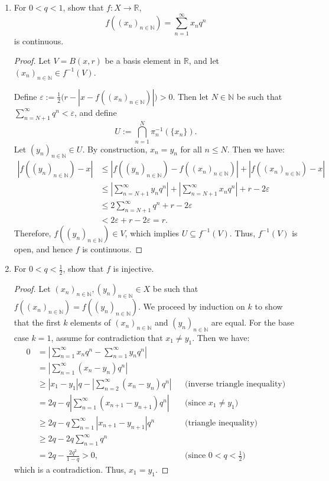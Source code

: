 \documentclass[a4paper,11pt]{article}
\newcommand{\N}{\mathbb{N}}
\newcommand{\R}{\mathbb{R}}
\newcommand{\inv}[1]{#1^{-1}}
\newcommand{\eps}{\varepsilon}
\begin{document}
\begin{enumerate}[label=\textbf{(\alph*)}]
    \item For $0 < q < 1$, show that $f \colon X \to \R$,
    \[ f((x_n)_{n\in\N}) = \sum_{n=1}^{\infty} x_n q^n \]
    is continuous.

    \begin{proof}
        Let $V = B(x, r)$ be a basis element in $\R$, and let $(x_n)_{n\in\N} \in \inv{f}(V)$.

        Define $\eps := \frac{1}{2}\bigl(r - |x - f((x_n)_{n\in\N})|\bigr) > 0$.
        Then let $N \in \N$ be such that $\sum_{n=N+1}^{\infty} q^n < \eps$, and define
        \[ U := \bigcap_{n=1}^N \inv{\pi_n}(\{x_n\}). \]
        Let $(y_n)_{n\in\N} \in U$. By construction, $x_n = y_n$ for all $n \leq N$. Then we have:
        \begin{align*}
        |f((y_n)_{n\in\N}) - x| &\leq |f((y_n)_{n\in\N}) - f((x_n)_{n\in\N})| + |f((x_n)_{n\in\N}) - x| \\
        &\leq \left|\sum_{n=N+1}^{\infty} y_n q^n\right| + \left|\sum_{n=N+1}^{\infty} x_n q^n\right| + r - 2\eps \\
        &\leq 2\sum_{n=N+1}^{\infty} q^n + r - 2\eps \\
        &< 2\eps + r - 2\eps = r.
        \end{align*}
        Therefore, $f((y_n)_{n\in\N}) \in V$, which implies $U \subseteq \inv{f}(V)$.
        Thus, $\inv{f}(V)$ is open, and hence $f$ is continuous. 
    \end{proof}

    \item For $0 < q < \frac{1}{2}$, show that $f$ is injective.
    \begin{proof}
        Let $(x_n)_{n\in\N}, (y_n)_{n\in\N} \in X$ be such that $f((x_n)_{n\in\N}) = f((y_n)_{n\in\N})$. 
        We proceed by induction on $k$ to show that the first $k$ elements of $(x_n)_{n\in\N}$ and $(y_n)_{n\in\N}$ are equal. For the base case $k=1$, assume for contradiction that $x_1 \neq y_1$.
        Then we have:
        \begin{align*}
            0 &= \left|\sum_{n=1}^{\infty} x_n q^n - \sum_{n=1}^{\infty} y_n q^n\right| \\
            &= \left|\sum_{n=1}^{\infty} (x_n - y_n) q^n\right| \\
            &\geq |x_1 - y_1|q - \left|\sum_{n=2}^{\infty} (x_n - y_n) q^n\right|
            && \text{(inverse triangle inequality)} \\
            &= 2q - q\left|\sum_{n=1}^{\infty} (x_{n+1} - y_{n+1}) q^n \right|
            && \text{(since $x_1 \neq y_1$)} \\
            &\geq 2q - q\sum_{n=1}^{\infty} |x_{n+1} - y_{n+1}| q^n
            && \text{(triangle inequality)} \\
            &\geq 2q - 2q\sum_{n=1}^{\infty} q^n \\
            &= 2q - \frac{2q^2}{1-q} > 0,
            && \text{(since $0 < q < \tfrac{1}{2}$)}
        \end{align*}
        which is a contradiction. Thus, $x_1 = y_1$.


\end{proof}
\end{enumerate}
\end{document}
